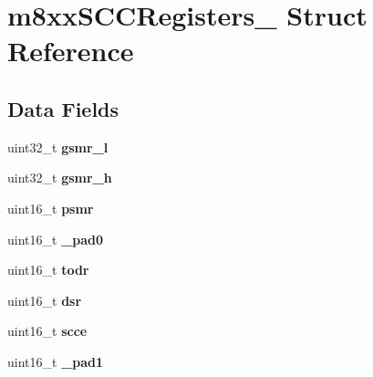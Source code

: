 \hypertarget{structm8xxSCCRegisters__}{}\section{m8xx\+S\+C\+C\+Registers\+\_\+ Struct Reference}
\label{structm8xxSCCRegisters__}
\subsection*{Data Fields}
\begin{DoxyCompactItemize}
\item 
\mbox{\label{structm8xxSCCRegisters___a17943005588e3811d33a2df80b36a841}} 
uint32\+\_\+t {\bfseries gsmr\+\_\+l}
\item 
\mbox{\label{structm8xxSCCRegisters___aa204b1b8da55e57b764f1c81b2a9c92e}} 
uint32\+\_\+t {\bfseries gsmr\+\_\+h}
\item 
\mbox{\label{structm8xxSCCRegisters___aa31db226157f9f9a6710ac306f031cc6}} 
uint16\+\_\+t {\bfseries psmr}
\item 
\mbox{\label{structm8xxSCCRegisters___aecd3b2337b706e4b8c3c83f097030b12}} 
uint16\+\_\+t {\bfseries \+\_\+pad0}
\item 
\mbox{\label{structm8xxSCCRegisters___a0211ca619ac47a5a854dbf4d5c3df3ed}} 
uint16\+\_\+t {\bfseries todr}
\item 
\mbox{\label{structm8xxSCCRegisters___a01e77486ad40ca830e1047db1c114535}} 
uint16\+\_\+t {\bfseries dsr}
\item 
\mbox{\label{structm8xxSCCRegisters___ad6717e0562622d46af672dc6395621c7}} 
uint16\+\_\+t {\bfseries scce}
\item 
\mbox{\label{structm8xxSCCRegisters___af4c7bf9923480cf15b22715c29a90b32}} 
uint16\+\_\+t {\bfseries \+\_\+pad1}
\item 
\mbox{\label{structm8xxSCCRegisters___a04871c4d9deea38a73a91322a23aeaac}} 

\end{DoxyCompactItemize}
